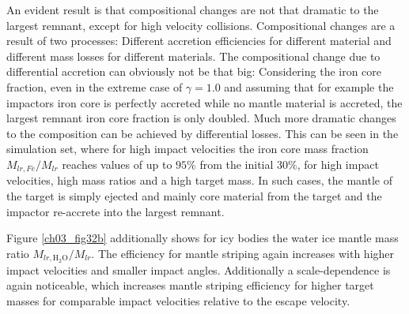 An evident result is that compositional changes are not that dramatic to the largest remnant, except for high velocity collisions. Compositional changes are a result of two processes: Different accretion efficiencies for different material and different mass losses for different materials. The compositional change due to differential accretion can obviously not be that big: Considering the iron core fraction, even in the extreme case of $\gamma = 1.0$ and assuming that for example the impactors iron core is perfectly accreted while no mantle material is accreted, the largest remnant iron core fraction is only doubled. Much more dramatic changes to the composition can be achieved by differential losses. This can be seen in the \css simulation set, where for high impact velocities the iron core mass fraction $M_{lr, Fe} / M_{lr}$ reaches values of up to $95 \%$ from the initial $30\%$, for high impact velocities, high mass ratios and a high target mass. In such cases, the mantle of the target is simply ejected and mainly core material from the target and the impactor re-accrete into the largest remnant. 


Figure \ref{ch03_fig32b} additionally shows for icy bodies the water ice mantle mass ratio $M_{lr, \mathrm{H}_2 \mathrm{O}} / M_{lr}$. The efficiency for mantle striping again increases with higher impact velocities and smaller impact angles. Additionally a scale-dependence is again noticeable, which increases mantle striping efficiency for higher target masses for comparable impact velocities relative to the escape velocity.

